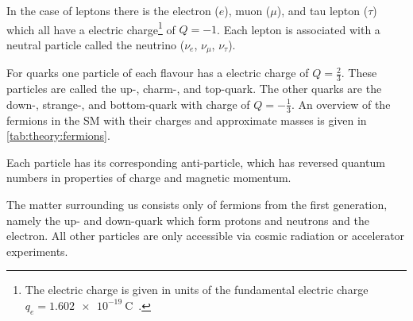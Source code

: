In the case of leptons there is the electron ($e$), muon ($\mu$), and tau lepton ($\tau$) which all have a electric
charge\footnote{The electric charge is given in units of the fundamental electric charge $q_e = \SI{1.602e-19}{\coulomb}$~\cite{PDG}.} of $Q = -1$.
Each lepton is associated with a neutral particle called the neutrino ($\nu_e$, $\nu_\mu$, $\nu_\tau$).

For quarks one particle of each flavour has a electric charge of $Q = \frac{2}{3}$. These particles are called the up-, charm-, and
top-quark.
The other quarks are the down-, strange-, and bottom-quark with charge of $Q = -\frac{1}{3}$.
An overview of the fermions in the SM with their charges and approximate masses is given in \cref{tab:theory:fermions}.

Each particle has its corresponding anti-particle, which has reversed quantum numbers in properties of charge and magnetic momentum.

The matter surrounding us consists only of fermions from the first generation, namely the up- and down-quark which form protons and neutrons and the electron.
All other particles are only accessible via cosmic radiation or accelerator experiments.

